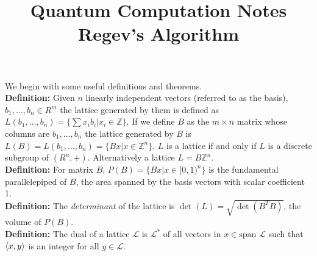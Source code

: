 \documentclass{article}
\title{Quantum Computation Notes \\ \large Regev's Algorithm}
\author{}
\date{}
\begin{document}
\maketitle
We begin with some useful definitions and theorems.\\
\textbf{Definition:} Given $n$ linearly independent vectors (referred to as the basis), $b_1, \dots, b_n \in R^{m}$ the lattice generated by them is defined as $L(b_1, \dots, b_n) = \{ \sum x_i b_i | x_i \in \mathbb{Z}\}$. If we define $B$ as the $m \times n$ matrix whose columns are $b_1, \dots, b_n$ the lattice generated by $B$ is  $L(B) = L(b_1, \dots, b_n) = \{ Bx | x \in \mathbb{Z}^n \}$. $L$ is a lattice if and only if $L$ is a discrete subgroup of $(R^n, +)$. Alternatively a lattice $L = B\mathbb{Z}^n$.\\
\textbf{Definition:} For matrix $B$, $P(B) = \{ Bx | x \in [0,1)^n\}$ is the fundamental parallelepiped of $B$, the area spanned by the basis vectors with scalar coefficient 1.\\
\textbf{Definition:} The \textit{determinant} of the lattice is $\det(L) = \sqrt{\det(B^TB)}$, the volume of $P(B)$.\\
\textbf{Definition:} The dual of a lattice $\mathcal{L}$ is $\mathcal{L}^*$ of all vectors in $x \in \text{span }\mathcal{L}$ such that $\braket{x,y}$ is an integer for all $y \in \mathcal{L}$.\\
\end{document}
